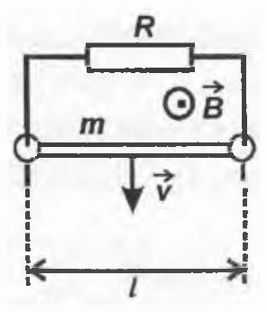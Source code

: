 \documentclass[10pt]{article}
\begin{document}
\includegraphics[max width=\textwidth, center]{2025_07_01_5b3ff9fa0d508c8e9f17g-183}
\end{document}
